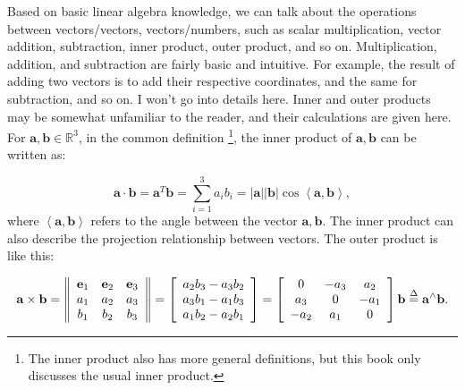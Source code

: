 Based on basic linear algebra knowledge, we can talk about the operations between vectors/vectors, vectors/numbers, such as scalar multiplication, vector addition, subtraction, inner product, outer product, and so on. Multiplication, addition, and subtraction are fairly basic and intuitive. For example, the result of adding two vectors is to add their respective coordinates, and the same for subtraction, and so on. I won't go into details here. Inner and outer products may be somewhat unfamiliar to the reader, and their calculations are given here. For $ \mathbf {a}, \mathbf {b} \in  \mathbb {R}^ 3 $, in the common definition \footnote {The inner product also has more general definitions, but this book only discusses the usual inner product.}, the inner product of $\mathbf{a}, \mathbf{b}$ can be written as:

\begin{equation}
\mathbf{a} \cdot \mathbf{b} = { \mathbf{a}^T }\mathbf{b} = \sum\limits_{i = 1}^3 {{a_i}{b_i}}  = \left| \mathbf{a} \right|\left| \mathbf{b} \right|\cos \left\langle {\mathbf{a},\mathbf{b}} \right\rangle ,
\end{equation}
where $ \left \langle { \mathbf {a}, \mathbf {b}} \right \rangle $ refers to the angle between the vector $ \mathbf {a}, \mathbf {b} $. The inner product can also describe the projection relationship between vectors. The outer product is like this:

\begin{equation}
\label{eq:cross}
\mathbf{a} \times \mathbf{b} = \left\| {\begin{array}{*{20}{c}}
	\mathbf{e}_1 & \mathbf{e}_2 & \mathbf{e}_3 \\
	{{a_1}}&{{a_2}}&{{a_3}}\\
	{{b_1}}&{{b_2}}&{{b_3}}
	\end{array}} \right\| = \left[ \begin{array}{l}
{a_2}{b_3} - {a_3}{b_2}\\
{a_3}{b_1} - {a_1}{b_3}\\
{a_1}{b_2} - {a_2}{b_1}
\end{array} \right] = \left[ {\begin{array}{*{20}{c}}
	0&{ - {a_3}}&{{a_2}}\\
	{{a_3}}&0&{-{a_1}}\\  
	{-{a_2}}&{{a_1}}&0  
	\end{array}} \right] \mathbf{b} \buildrel \Delta \over = { \mathbf{a}^ \wedge } \mathbf{b}.
\end{equation}

